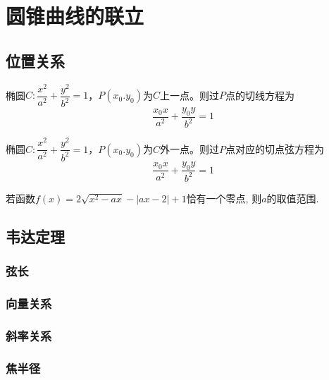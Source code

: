 \section{圆锥曲线的联立}
\subsection{位置关系}

\begin{theorem}
    椭圆\(C:\dfrac{x^2}{a^2}+\dfrac{y^2}{b^2}=1\)，\(P(x_0.y_0)\)为\(C\)上一点。则过\(P\)点的切线方程为
    \begin{equation}
        \dfrac{x_0x}{a^2}+\dfrac{y_0y}{b^2}=1
    \end{equation}
\end{theorem}
\begin{corollary}
    椭圆\(C:\dfrac{x^2}{a^2}+\dfrac{y^2}{b^2}=1\)，\(P(x_0.y_0)\)为\(C\)外一点。则过\(P\)点对应的切点弦方程为
    \begin{equation}
        \dfrac{x_0x}{a^2}+\dfrac{y_0y}{b^2}=1
    \end{equation}
\end{corollary}




\begin{example}\label{高考:2024年天津卷15:2}
    若函数\(f(x)=2\sqrt{x^2-ax}-|ax-2|+1\)恰有一个零点, 则\(a\)的取值范围\uline{\makebox[1.5cm]{}}. 
\end{example}











\clearpage
\subsection{韦达定理}
\subsubsection{弦长}
\clearpage
\subsubsection{向量关系}
\clearpage
\subsubsection{斜率关系}
\clearpage
\subsubsection{焦半径}

